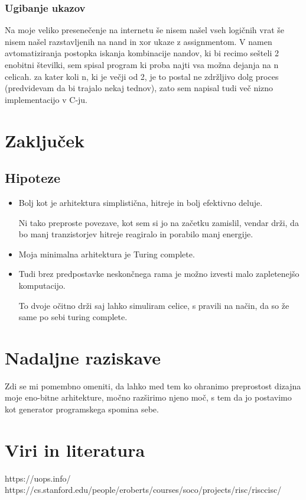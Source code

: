 \documentclass[12pt]{article}
\begin{document}
\subsubsection{Ugibanje ukazov}
Na moje veliko presenečenje na internetu še nisem našel vseh logičnih vrat še nisem našel razstavljenih na nand in xor ukaze z assignmentom.
V namen avtomatiziranja postopka iskanja kombinacije nandov, ki bi recimo sešteli 2 enobitni številki, sem spisal program ki proba najti vsa možna dejanja na n celicah.
za kater koli n, ki je večji od 2, je to postal ne zdržljivo dolg proces (predvidevam da bi trajalo nekaj tednov),  zato sem napisal tudi več nizno implementacijo v C-ju.

\section{Zaključek}
\subsection{Hipoteze}
\begin{itemize}
  \item Bolj kot je arhitektura simplistična, hitreje in bolj efektivno deluje.

        Ni tako preproste povezave, kot sem si jo na začetku zamislil, vendar drži, da bo manj tranzistorjev hitreje reagiralo in porabilo manj energije.

  \item Moja minimalna arhitektura je Turing complete.
  \item Tudi brez predpostavke neskončnega rama je možno izvesti malo zapletenejšo komputacijo.

        To dvoje očitno drži saj lahko simuliram celice, s pravili na način, da so že same po sebi turing complete.
\end{itemize}

\section{Nadaljne raziskave}
Zdi se mi pomembno omeniti, da lahko med tem ko ohranimo preprostost dizajna moje eno-bitne arhitekture, močno razširimo njeno moč, s tem da jo postavimo kot generator programskega spomina sebe.

\pagebreak
\section{Viri in literatura}
https://uops.info/
https://cs.stanford.edu/people/eroberts/courses/soco/projects/risc/risccisc/

\end{document}
